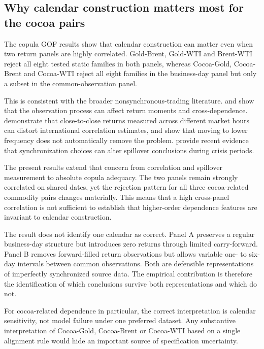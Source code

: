 \subsection{Why calendar construction matters most for the cocoa pairs}

The copula GOF results show that calendar construction can matter even when two return panels are highly correlated. Gold-Brent, Gold-WTI and Brent-WTI reject all eight tested static families in both panels, whereas Cocoa-Gold, Cocoa-Brent and Cocoa-WTI reject all eight families in the business-day panel but only a subset in the common-observation panel.

This is consistent with the broader nonsynchronous-trading literature. \citet{scholes1977} and \citet{lo1990} show that the observation process can affect return moments and cross-dependence. \citet{martens2001} demonstrate that close-to-close returns measured across different market hours can distort international correlation estimates, and \citet{schotman2006} show that moving to lower frequency does not automatically remove the problem. \citet{dimitriou2025} provide recent evidence that synchronization choices can alter spillover conclusions during crisis periods.

The present results extend that concern from correlation and spillover measurement to absolute copula adequacy. The two panels remain strongly correlated on shared dates, yet the rejection pattern for all three cocoa-related commodity pairs changes materially. This means that a high cross-panel correlation is not sufficient to establish that higher-order dependence features are invariant to calendar construction.

The result does not identify one calendar as correct. Panel A preserves a regular business-day structure but introduces zero returns through limited carry-forward. Panel B removes forward-filled return observations but allows variable one- to six-day intervals between common observations. Both are defensible representations of imperfectly synchronized source data. The empirical contribution is therefore the identification of which conclusions survive both representations and which do not.

For cocoa-related dependence in particular, the correct interpretation is calendar sensitivity, not model failure under one preferred dataset. Any substantive interpretation of Cocoa-Gold, Cocoa-Brent or Cocoa-WTI based on a single alignment rule would hide an important source of specification uncertainty.

